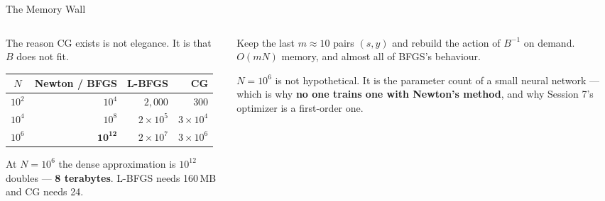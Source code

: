\begin{frame}{The Memory Wall}
\begin{columns}[T]
\begin{column}{0.52\textwidth}
\small
The reason CG exists is not elegance. It is that $B$ does not fit.
\medskip
\begin{center}\footnotesize
\begin{tabularx}{\linewidth}{@{}c r r r@{}}
\toprule
$N$ & \textbf{Newton / BFGS} & \textbf{L-BFGS} & \textbf{CG} \\
\midrule
$10^{2}$ & $10^{4}$ & $2{,}000$ & $300$ \\
$10^{4}$ & $10^{8}$ & $2\times10^{5}$ & $3\times10^{4}$ \\
$10^{6}$ & $\mathbf{10^{12}}$ & $2\times10^{7}$ & $3\times10^{6}$ \\
\bottomrule
\end{tabularx}
\end{center}
\medskip
At $N=10^{6}$ the dense approximation is $10^{12}$ doubles --- \textbf{8 terabytes}. L-BFGS needs 160\,MB and CG needs 24.
\end{column}
\begin{column}{0.45\textwidth}
\begin{conceptbox}[title=\textbf{L-BFGS}]\small
Keep the last $m\approx10$ pairs $(s,y)$ and rebuild the action of $B^{-1}$ on demand. $O(mN)$ memory, and almost all of BFGS's behaviour.
\end{conceptbox}
\medskip
\begin{takeawaybox}\footnotesize
$N=10^{6}$ is not hypothetical. It is the parameter count of a small neural network --- which is why \textbf{no one trains one with Newton's method}, and why Session 7's optimizer is a first-order one.
\end{takeawaybox}
\end{column}
\end{columns}
\end{frame}

